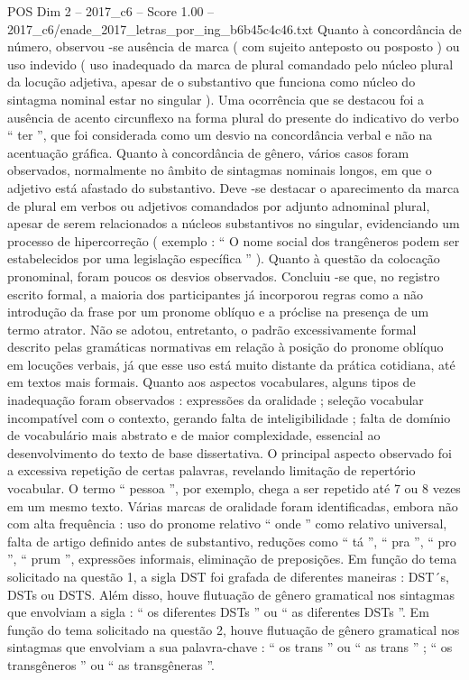 \begin{textsample}{POS Dim 2 – 2017\_c6 – Score 1.00 – 2017\_c6/enade\_2017\_letras\_por\_ing\_b6b45c4c46.txt}
Quanto à concordância de número, observou -se ausência de marca ( com sujeito anteposto ou posposto ) ou uso indevido ( uso inadequado da marca de plural comandado pelo núcleo plural da locução adjetiva, apesar de o substantivo que funciona como núcleo do sintagma nominal estar no singular ).
Uma ocorrência que se destacou foi a ausência de acento circunflexo na forma plural do presente do indicativo do verbo “ ter ”, que foi considerada como um desvio na concordância verbal e não na acentuação gráfica.
Quanto à concordância de gênero, vários casos foram observados, normalmente no âmbito de sintagmas nominais longos, em que o adjetivo está afastado do substantivo.
Deve -se destacar o aparecimento da marca de plural em verbos ou adjetivos comandados por adjunto adnominal plural, apesar de serem relacionados a núcleos substantivos no singular, evidenciando um processo de hipercorreção ( exemplo : “ O nome social dos trangêneros podem ser estabelecidos por uma legislação específica ” ).
Quanto à questão da colocação pronominal, foram poucos os desvios observados.
Concluiu -se que, no registro escrito formal, a maioria dos participantes já incorporou regras como a não introdução da frase por um pronome oblíquo e a próclise na presença de um termo atrator.
Não se adotou, entretanto, o padrão excessivamente formal descrito pelas gramáticas normativas em relação à posição do pronome oblíquo em locuções verbais, já que esse uso está muito distante da prática cotidiana, até em textos mais formais.
Quanto aos aspectos vocabulares, alguns tipos de inadequação foram observados : expressões da oralidade ; seleção vocabular incompatível com o contexto, gerando falta de inteligibilidade ; falta de domínio de vocabulário mais abstrato e de maior complexidade, essencial ao desenvolvimento do texto de base dissertativa.
O principal aspecto observado foi a excessiva repetição de certas palavras, revelando limitação de repertório vocabular.
O termo “ pessoa ”, por exemplo, chega a ser repetido até 7 ou 8 vezes em um mesmo texto.
Várias marcas de oralidade foram identificadas, embora não com alta frequência : uso do pronome relativo “ onde ” como relativo universal, falta de artigo definido antes de substantivo, reduções como “ tá ”, “ pra ”, “ pro ”, “ prum ”, expressões informais, eliminação de preposições.
Em função do tema solicitado na questão 1, a sigla DST foi grafada de diferentes maneiras : DST´s, DSTs ou DSTS.
Além disso, houve flutuação de gênero gramatical nos sintagmas que envolviam a sigla : “ os diferentes DSTs ” ou “ as diferentes DSTs ”.
Em função do tema solicitado na questão 2, houve flutuação de gênero gramatical nos sintagmas que envolviam a sua palavra-chave : “ os trans ” ou “ as trans ” ; “ os transgêneros ” ou “ as transgêneras ”.

\end{textsample}
